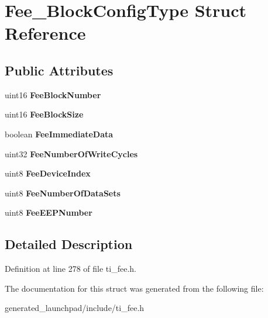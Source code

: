 \hypertarget{structFee__BlockConfigType}{}\section{Fee\+\_\+\+Block\+Config\+Type Struct Reference}
\label{structFee__BlockConfigType}
\subsection*{Public Attributes}
\begin{DoxyCompactItemize}
\item 
\mbox{\label{structFee__BlockConfigType_a75a0f473c049cdc9d35f9430f0e9519b}} 
uint16 {\bfseries Fee\+Block\+Number}
\item 
\mbox{\label{structFee__BlockConfigType_a165228947b39dcc267f563a204e0f9cc}} 
uint16 {\bfseries Fee\+Block\+Size}
\item 
\mbox{\label{structFee__BlockConfigType_a3f2168023f6a6d01392f39bdcd629339}} 
boolean {\bfseries Fee\+Immediate\+Data}
\item 
\mbox{\label{structFee__BlockConfigType_a01f7120413d57908344e6250f7d1673d}} 
uint32 {\bfseries Fee\+Number\+Of\+Write\+Cycles}
\item 
\mbox{\label{structFee__BlockConfigType_a9abf2294f92879f68147bd9d7c24da0a}} 
uint8 {\bfseries Fee\+Device\+Index}
\item 
\mbox{\label{structFee__BlockConfigType_a962fcef38c40d323a822320fb3bf56ba}} 
uint8 {\bfseries Fee\+Number\+Of\+Data\+Sets}
\item 
\mbox{\label{structFee__BlockConfigType_a10f717db7231f833eef9f8725f59e694}} 
uint8 {\bfseries Fee\+E\+E\+P\+Number}
\end{DoxyCompactItemize}


\subsection{Detailed Description}


Definition at line 278 of file ti\+\_\+fee.\+h.



The documentation for this struct was generated from the following file\+:\begin{DoxyCompactItemize}
\item 
generated\+\_\+launchpad/include/ti\+\_\+fee.\+h\end{DoxyCompactItemize}
